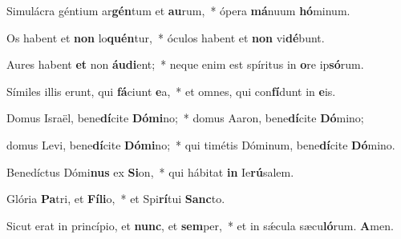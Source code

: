 \item Simulácra géntium ar\textbf{gén}tum et \textbf{au}rum,~* ópera \textbf{má}nuum \textbf{hó}minum.

\item Os habent et \textbf{non} lo\textbf{quén}tur,~* óculos habent et \textbf{non} vi\textbf{dé}bunt.

\item Aures habent \textbf{et} non \textbf{áu}\textbf{di}ent;~* neque enim est spíritus in \textbf{o}re ip\textbf{só}rum.

\item Símiles illis erunt, qui \textbf{fá}ciunt \textbf{e}a,~* et omnes, qui con\textbf{fí}dunt in \textbf{e}is.

\item Domus Israël, bene\textbf{dí}cite \textbf{Dó}\textbf{mi}no;~* domus Aaron, bene\textbf{dí}cite \textbf{Dó}mino;

\item domus Levi, bene\textbf{dí}cite \textbf{Dó}\textbf{mi}no;~* qui timétis Dóminum, bene\textbf{dí}cite \textbf{Dó}mino.

\item Benedíctus Dómi\textbf{nus} ex \textbf{Si}on,~* qui hábitat \textbf{in} Ie\textbf{rú}salem.

\item Glória \textbf{Pa}tri, et \textbf{Fí}\textbf{li}o,~* et Spi\textbf{rí}tui \textbf{Sanc}to.

\item Sicut erat in princípio, et \textbf{nunc}, et \textbf{sem}per,~* et in sǽcula sæcu\textbf{ló}rum. \textbf{A}men.
